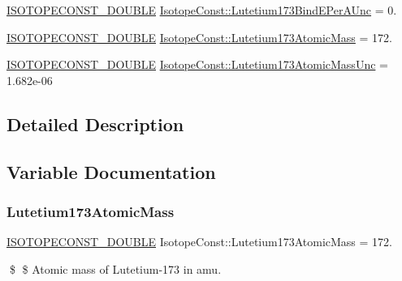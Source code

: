 \begin{DoxyCompactItemize}
\mbox{\hyperlink{group___isotope_const-_macros_ga8f45a7272ce02c0b4c65c44636ed719a}{I\+S\+O\+T\+O\+P\+E\+C\+O\+N\+S\+T\+\_\+\+D\+O\+U\+B\+LE}} \mbox{\hyperlink{group___isotope_const-_lutetium-_lu173_ga8257f9ee4a6b3e3a737f28710edcac7f}{Isotope\+Const\+::\+Lutetium173\+Bind\+E\+Per\+A\+Unc}} = 0.
\item 
\mbox{\hyperlink{group___isotope_const-_macros_ga8f45a7272ce02c0b4c65c44636ed719a}{I\+S\+O\+T\+O\+P\+E\+C\+O\+N\+S\+T\+\_\+\+D\+O\+U\+B\+LE}} \mbox{\hyperlink{group___isotope_const-_lutetium-_lu173_ga186993b3a019655e77fef0eda89aa470}{Isotope\+Const\+::\+Lutetium173\+Atomic\+Mass}} = 172.
\item 
\mbox{\hyperlink{group___isotope_const-_macros_ga8f45a7272ce02c0b4c65c44636ed719a}{I\+S\+O\+T\+O\+P\+E\+C\+O\+N\+S\+T\+\_\+\+D\+O\+U\+B\+LE}} \mbox{\hyperlink{group___isotope_const-_lutetium-_lu173_ga9e42d154adfc4b8371d80e4b0830cfe8}{Isotope\+Const\+::\+Lutetium173\+Atomic\+Mass\+Unc}} = 1.\+682e-\/06
\end{DoxyCompactItemize}


\subsection{Detailed Description}


\subsection{Variable Documentation}
\mbox{\label{group___isotope_const-_lutetium-_lu173_ga186993b3a019655e77fef0eda89aa470}} 
\subsubsection{\texorpdfstring{Lutetium173\+Atomic\+Mass}{Lutetium173AtomicMass}}
{\footnotesize\ttfamily \mbox{\hyperlink{group___isotope_const-_macros_ga8f45a7272ce02c0b4c65c44636ed719a}{I\+S\+O\+T\+O\+P\+E\+C\+O\+N\+S\+T\+\_\+\+D\+O\+U\+B\+LE}} Isotope\+Const\+::\+Lutetium173\+Atomic\+Mass = 172.}

\$ \$ Atomic mass of Lutetium-\/173 in amu. \mbox{\label{group___isotope_const-_lutetium-_lu173_ga9e42d154adfc4b8371d80e4b0830cfe8}} 
